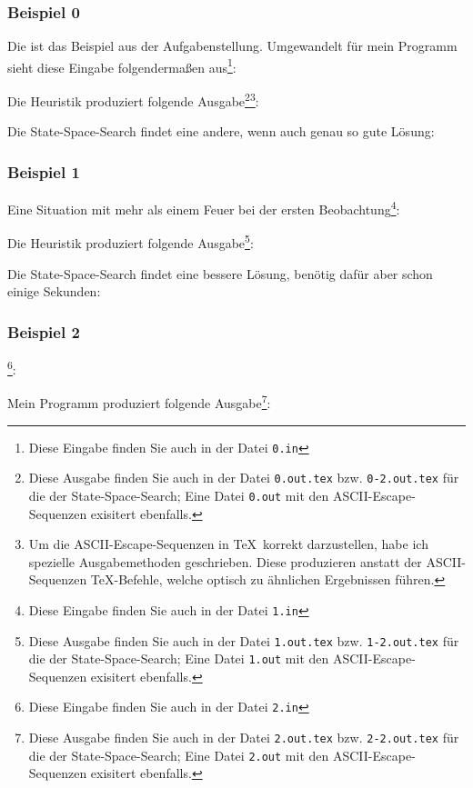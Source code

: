 \subsubsection*{Beispiel 0}
Die ist das Beispiel aus der Aufgabenstellung. Umgewandelt für mein Programm sieht diese Eingabe folgendermaßen aus\footnote{Diese Eingabe finden Sie auch in der Datei \texttt{0.in}}:
{\small

}
Die Heuristik produziert folgende Ausgabe\footnote{Diese Ausgabe finden Sie auch in der Datei \texttt{0.out.tex} bzw. \texttt{0-2.out.tex} für die der State-Space-Search; Eine Datei \texttt{0.out} mit den ASCII-Escape-Sequenzen exisitert ebenfalls.}\footnote{Um die ASCII-Escape-Sequenzen in \TeX\, korrekt darzustellen, habe ich spezielle Ausgabemethoden geschrieben. Diese produzieren anstatt der ASCII-Sequenzen \TeX -Befehle, welche optisch zu ähnlichen Ergebnissen führen.}:\\
{\ttfamily \small

}

Die State-Space-Search findet eine andere, wenn auch genau so gute Lösung:\\

{\ttfamily \small

}

\subsubsection*{Beispiel 1}
Eine Situation mit mehr als einem Feuer bei der ersten Beobachtung\footnote{Diese Eingabe finden Sie auch in der Datei \texttt{1.in}}:
{\small

}
Die Heuristik produziert folgende Ausgabe\footnote{Diese Ausgabe finden Sie auch in der Datei \texttt{1.out.tex} bzw. \texttt{1-2.out.tex} für die der State-Space-Search; Eine Datei \texttt{1.out} mit den ASCII-Escape-Sequenzen exisitert ebenfalls.}:\\
{\ttfamily \small

}

Die State-Space-Search findet eine bessere Lösung, benötig dafür aber schon einige Sekunden:

{\ttfamily \small

}
\subsubsection*{Beispiel 2}
\footnote{Diese Eingabe finden Sie auch in der Datei \texttt{2.in}}:
{\small

}
Mein Programm produziert folgende Ausgabe\footnote{Diese Ausgabe finden Sie auch in der Datei \texttt{2.out.tex} bzw. \texttt{2-2.out.tex} für die der State-Space-Search; Eine Datei \texttt{2.out} mit den ASCII-Escape-Sequenzen exisitert ebenfalls.}:\\
{\ttfamily \small

}

